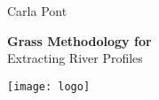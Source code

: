 \begin{titlingpage}

	\raggedleft %
	
	\vspace*{\baselineskip} %
	
	
	{\Large Carla Pont} %
	
	\vspace*{0.167\textheight} %
	
	
	\textbf{\LARGE Grass Methodology for}\\[\baselineskip] %
	
	{\textcolor{mygray}{\Huge Extracting River Profiles}}\\[\baselineskip] %
	
	
	\vfill %
	
	
	{\texttt{[image: logo]}} %
	
	\vspace*{3\baselineskip} %

\maketitle
\end{titlingpage}{\clearforchapter}{\clearforchapter}

